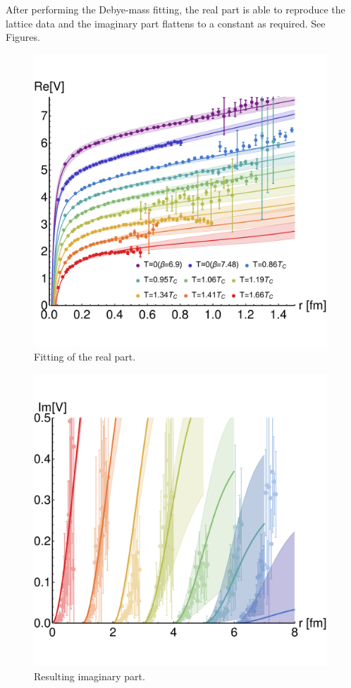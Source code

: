 \documentclass[12pt,a4paper]{article}
\begin{document}
After performing the Debye-mass fitting, the real part is able to reproduce the lattice data and the imaginary part flattens to a constant as required. See Figures.
\begin{figure}[h]
	\centering
	\includegraphics[width=11cm]{Debye_fitting} 
	\caption{Fitting of the real part.}    	
	\label{fig:ReVfit}
\end{figure}
\begin{figure}[h]
	\centering
	\includegraphics[width=11cm]{Debye_fitting2} 
	\caption{Resulting imaginary part.}    	
	\label{fig:ImVfit}
\end{figure}
\end{document}
